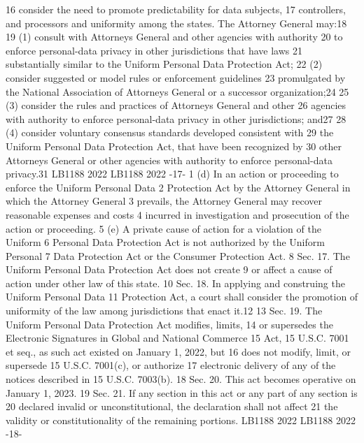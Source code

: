 16 consider the need to promote predictability for data subjects,
17 controllers, and processors and uniformity among the states. The Attorney
General may:18
19 (1) consult with Attorneys General and other agencies with authority
20 to enforce personal-data privacy in other jurisdictions that have laws
21 substantially similar to the Uniform Personal Data Protection Act;
22 (2) consider suggested or model rules or enforcement guidelines
23 promulgated by the National Association of Attorneys General or a
successor organization;24
25 (3) consider the rules and practices of Attorneys General and other
26 agencies with authority to enforce personal-data privacy in other
jurisdictions; and27
28 (4) consider voluntary consensus standards developed consistent with
29 the Uniform Personal Data Protection Act, that have been recognized by
30 other Attorneys General or other agencies with authority to enforce
personal-data privacy.31
LB1188
2022
LB1188
2022
-17-
1 (d) In an action or proceeding to enforce the Uniform Personal Data
2 Protection Act by the Attorney General in which the Attorney General
3 prevails, the Attorney General may recover reasonable expenses and costs
4 incurred in investigation and prosecution of the action or proceeding.
5 (e) A private cause of action for a violation of the Uniform
6 Personal Data Protection Act is not authorized by the Uniform Personal
7 Data Protection Act or the Consumer Protection Act.
8 Sec. 17. The Uniform Personal Data Protection Act does not create
9 or affect a cause of action under other law of this state.
10 Sec. 18. In applying and construing the Uniform Personal Data
11 Protection Act, a court shall consider the promotion of uniformity of the
law among jurisdictions that enact it.12
13 Sec. 19. The Uniform Personal Data Protection Act modifies, limits,
14 or supersedes the Electronic Signatures in Global and National Commerce
15 Act, 15 U.S.C. 7001 et seq., as such act existed on January 1, 2022, but
16 does not modify, limit, or supersede 15 U.S.C. 7001(c), or authorize
17 electronic delivery of any of the notices described in 15 U.S.C. 7003(b).
18 Sec. 20. This act becomes operative on January 1, 2023.
19 Sec. 21. If any section in this act or any part of any section is
20 declared invalid or unconstitutional, the declaration shall not affect
21 the validity or constitutionality of the remaining portions.
LB1188
2022
LB1188
2022
-18-